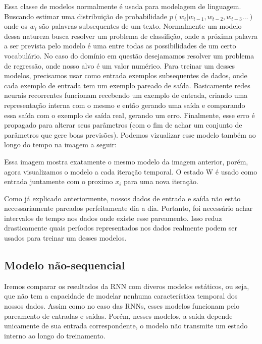 Essa classe de modelos normalmente é usada para modelagem de linguagem. Buscando estimar uma distribuição de probabilidade $p(w_t | w_{t-1},w_{t-2},w_{t-3} \dots ) $ onde os $w_i$ são palavras subsequentes de um texto. Normalmente um modelo dessa natureza busca resolver um problema de classifição, onde a próxima palavra a ser prevista pelo modelo é uma entre todas as possibilidades de um certo vocabulário. No caso do domínio em questão desejamamos resolver um problema de regressão, onde nosso alvo é um valor numérico. Para treinar um desses modelos, precisamos usar como entrada exemplos subsequentes de dados, onde cada exemplo de entrada tem um exemplo pareado de saída. Basicamente redes neurais recorrentes funcionam recebendo um exemplo de entrada, criando uma representação interna com o mesmo e então gerando uma saída e comparando essa saída com o exemplo de saída real, gerando um erro. Finalmente, esse erro é propagado para alterar seus parâmetros (com o fim de achar um conjunto de parâmetros que gere boas previsões). Podemos vizualizar esse modelo também ao longo do tempo na imagem a seguir:


% 


Essa imagem mostra exatamente o mesmo modelo da imagem anterior, porém, agora visualizamos o modelo a cada iteração temporal. O estado W é usado como entrada juntamente com o proximo $x_i$ para uma nova iteração.

\bigskip

Como já explicado anteriormente, nossos dados de entrada e saída não estão necessariamente pareados perfeitamente dia a dia. Portanto, foi necessário achar intervalos de tempo nos dados onde existe esse pareamento. Isso reduz drasticamente quais períodos representados nos dados realmente podem ser usados para treinar um desses modelos.



\subsection{Modelo não-sequencial}



Iremos comparar os resultados da RNN com diveros modelos estáticos, ou seja, que não tem a capacidade de modelar nenhuma característica temporal dos nossos dados. Assim como no caso das RNNs, esses modelos funcionam pelo pareamento de entradas e saídas. Porém, nesses modelos, a saída depende unicamente de sua entrada correspondente, o modelo não transmite um estado interno ao longo do treinamento.




